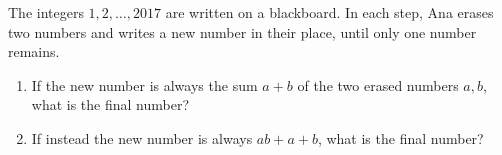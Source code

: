 The integers $1,2,\dots,2017$ are written on a blackboard. In each step, Ana erases two numbers and writes a new number in their place, until only one number remains.
\begin{enumerate}
\item[(a)] If the new number is always the sum $a+b$ of the two erased numbers $a,b$, what is the final number?
\item[(b)] If instead the new number is always $ab+a+b$, what is the final number?
\end{enumerate}
